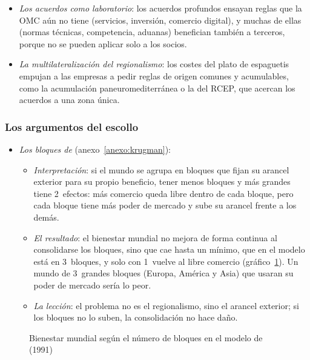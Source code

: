 \documentclass[11pt]{article}
\begin{document}
\begin{itemize}
\item \emph{Los acuerdos como laboratorio}: los acuerdos profundos ensayan reglas que la OMC aún no tiene (servicios, inversión, comercio digital), y muchas de ellas (normas técnicas, competencia, aduanas) benefician también a terceros, porque no se pueden aplicar solo a los socios\nocite{Baldwin2011Regionalism,MattooMulabdicRuta2022}.
\item \emph{La multilateralización del regionalismo}: los costes del plato de espaguetis empujan a las empresas a pedir reglas de origen comunes y acumulables, como la acumulación paneuromediterránea o la del RCEP, que acercan los acuerdos a una zona única\nocite{Baldwin2006Multilateralising}.
\end{itemize}

\subsubsection{Los argumentos del escollo}\label{sec:escollo}

\begin{itemize}
\item \emph{Los bloques de } (anexo~\ref{anexo:krugman}):
  \begin{itemize}
  \item \emph{Interpretación}: si el mundo se agrupa en bloques que fijan su arancel exterior para su propio beneficio, tener menos bloques y más grandes tiene 2~efectos: más comercio queda libre dentro de cada bloque, pero cada bloque tiene más poder de mercado y sube su arancel frente a los demás\nocite{Krugman1991Bilateralism}.
  \item \emph{El resultado}: el bienestar mundial no mejora de forma continua al consolidarse los bloques, sino que cae hasta un mínimo, que en el modelo está en 3~bloques, y solo con 1~vuelve al libre comercio (gráfico~\ref{fig:krugman}). Un mundo de 3~grandes bloques (Europa, América y Asia) que usaran su poder de mercado sería lo peor.
  \item \emph{La lección}: el problema no es el regionalismo, sino el arancel exterior; si los bloques no lo suben, la consolidación no hace daño.
  \end{itemize}
\end{itemize}

\begin{figure}[H]
\centering
\caption{Bienestar mundial según el número de bloques en el modelo de  (1991)}\label{fig:krugman}
\end{figure}
\end{document}
